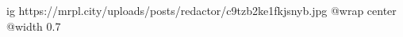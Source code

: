  
 
 
 
 

\ifcmt
  ig https://mrpl.city/uploads/posts/redactor/c9tzb2ke1fkjsnyb.jpg
  @wrap center
  @width 0.7
\fi
